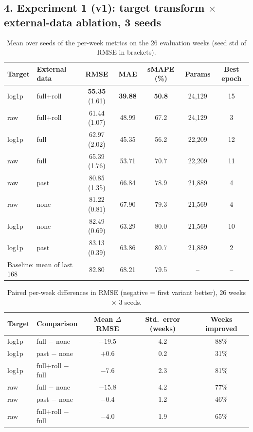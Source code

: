 \documentclass[10.5pt,a4paper]{article}
\begin{document}
\subsection*{4. Experiment 1 (v1): target transform $\times$ external-data ablation, 3 seeds}
\begin{table}[H]\centering\small
\caption{Mean over seeds of the per-week metrics on the 26 evaluation weeks (seed std of RMSE in brackets).}
\begin{tabular}{llccccc}\toprule
Target & External data & RMSE & MAE & sMAPE (\%) & Params & Best epoch\\\midrule
log1p & full+roll & \textbf{55.35} (1.61) & \textbf{39.88} & \textbf{50.8} & 24{,}129 & 15\\
raw & full+roll & 61.44 (1.07) & 48.99 & 67.2 & 24{,}129 & 3\\
log1p & full & 62.97 (2.02) & 45.35 & 56.2 & 22{,}209 & 12\\
raw & full & 65.39 (1.76) & 53.71 & 70.7 & 22{,}209 & 11\\
raw & past & 80.85 (1.35) & 66.84 & 78.9 & 21{,}889 & 4\\
raw & none & 81.22 (0.81) & 67.90 & 79.3 & 21{,}569 & 4\\
log1p & none & 82.49 (0.69) & 63.29 & 80.0 & 21{,}569 & 10\\
log1p & past & 83.13 (0.39) & 63.86 & 80.7 & 21{,}889 & 2\\\midrule
\multicolumn{2}{l}{Baseline: mean of last 168} & 82.80 & 68.21 & 79.5 & -- & --\\\bottomrule
\end{tabular}\end{table}

\begin{table}[H]\centering\small
\caption{Paired per-week differences in RMSE (negative = first variant better), 26 weeks $\times$ 3 seeds.}
\begin{tabular}{llccc}\toprule
Target & Comparison & Mean $\Delta$RMSE & Std.\ error (weeks) & Weeks improved\\\midrule
log1p & full $-$ none & $-19.5$ & 4.2 & 88\%\\
log1p & past $-$ none & $+0.6$ & 0.2 & 31\%\\
log1p & full+roll $-$ full & $-7.6$ & 2.3 & 81\%\\
raw & full $-$ none & $-15.8$ & 4.2 & 77\%\\
raw & past $-$ none & $-0.4$ & 1.2 & 46\%\\
raw & full+roll $-$ full & $-4.0$ & 1.9 & 65\%\\\bottomrule
\end{tabular}\end{table}
\end{document}

